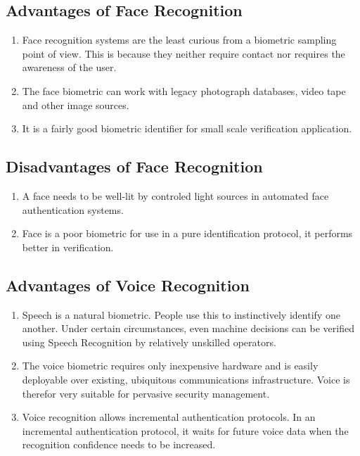 \subsection{Advantages of Face Recognition}

\begin{enumerate}
  \item Face recognition systems are the least curious from a biometric sampling point of view. This is because they neither require contact nor requires the awareness of the user.
  \item The face biometric can work with legacy photograph databases, video tape and other image sources.
  \item It is a fairly good biometric identifier for small scale verification application.
\end{enumerate}

\subsection{Disadvantages of Face Recognition}

\begin{enumerate}
  \item A face needs to be well-lit by controled light sources in automated face authentication systems.
  \item Face is a poor biometric for use in a pure identification protocol, it performs better in verification.
\end{enumerate}

\subsection{Advantages of Voice Recognition}

\begin{enumerate}
  \item Speech is a natural biometric. People use this to instinctively identify one another. Under certain circumstances, even machine decisions can be verified using Speech Recognition  by relatively unskilled operators.
  \item The voice biometric requires only inexpensive hardware and is easily deployable over existing, ubiquitous communications infrastructure. Voice is therefor very suitable for pervasive security management.
  \item Voice recognition allows incremental authentication protocols. In an incremental authentication protocol, it waits for future voice data when the recognition confidence needs to be increased.
\end{enumerate}


